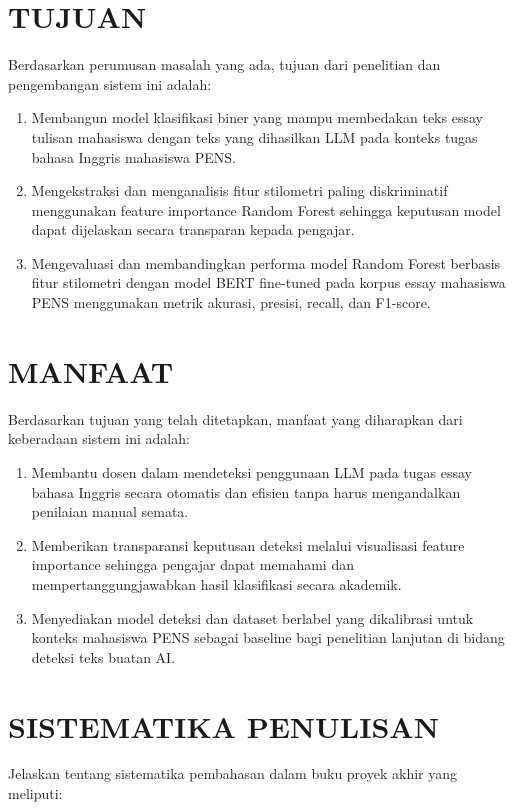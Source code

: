\fi

\section{TUJUAN}

Berdasarkan perumusan masalah yang ada, tujuan dari penelitian dan pengembangan sistem ini adalah:
\begin{enumerate}[label=\arabic*., leftmargin=*]
    \item Membangun model klasifikasi biner yang mampu membedakan teks essay tulisan mahasiswa dengan teks yang dihasilkan LLM pada konteks tugas bahasa Inggris mahasiswa PENS.
    \item Mengekstraksi dan menganalisis fitur stilometri paling diskriminatif menggunakan feature importance Random Forest sehingga keputusan model dapat dijelaskan secara transparan kepada pengajar.
    \item Mengevaluasi dan membandingkan performa model Random Forest berbasis fitur stilometri dengan model BERT fine-tuned pada korpus essay mahasiswa PENS menggunakan metrik akurasi, presisi, recall, dan F1-score.
\end{enumerate}

\section{MANFAAT}

Berdasarkan tujuan yang telah ditetapkan, manfaat yang diharapkan dari keberadaan sistem ini adalah:
\begin{enumerate}[label=\arabic*., leftmargin=*]
    \item Membantu dosen dalam mendeteksi penggunaan LLM pada tugas essay bahasa Inggris secara otomatis dan efisien tanpa harus mengandalkan penilaian manual semata.
    \item Memberikan transparansi keputusan deteksi melalui visualisasi feature importance sehingga pengajar dapat memahami dan mempertanggungjawabkan hasil klasifikasi secara akademik.
    \item Menyediakan model deteksi dan dataset berlabel yang dikalibrasi untuk konteks mahasiswa PENS sebagai baseline bagi penelitian lanjutan di bidang deteksi teks buatan AI.
\end{enumerate}

\section{SISTEMATIKA PENULISAN}

Jelaskan tentang sistematika pembahasan dalam buku proyek akhir yang meliputi:


